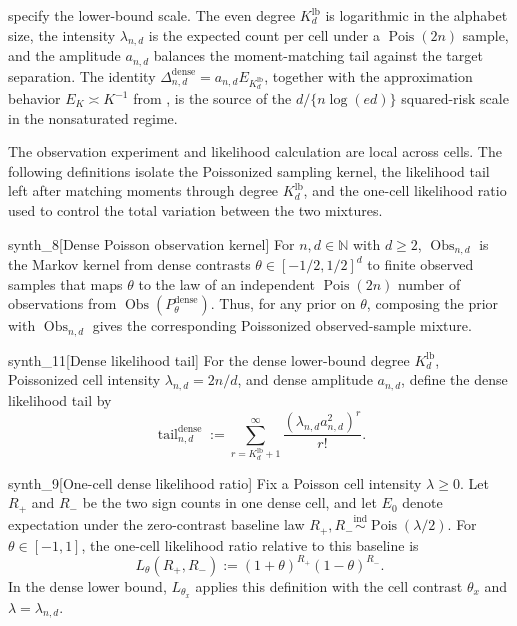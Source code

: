 specify the lower-bound scale. The even degree \(K_d^{\mathrm{lb}}\) is logarithmic in the alphabet size, the intensity \(\lambda_{n,d}\) is the expected count per cell under a \(\operatorname{Pois}(2n)\) sample, and the amplitude \(a_{n,d}\) balances the moment-matching tail against the target separation. The identity \(\Delta_{n,d}^{\mathrm{dense}}=a_{n,d}E_{K_d^{\mathrm{lb}}}\), together with the approximation behavior \(E_K\asymp K^{-1}\) from \citet{CaiLow2011L1}, is the source of the \(d/\{n\log(ed)\}\) squared-risk scale in the nonsaturated regime.

The observation experiment and likelihood calculation are local across cells. The following definitions isolate the Poissonized sampling kernel, the likelihood tail left after matching moments through degree \(K_d^{\mathrm{lb}}\), and the one-cell likelihood ratio used to control the total variation between the two mixtures.

\begin{definitionv}{synth_8}[Dense Poisson observation kernel]
For \(n,d\in\mathbb N\) with \(d\ge2\), \(\operatorname{Obs}_{n,d}\) is the Markov kernel from dense contrasts \(\theta\in[-1/2,1/2]^d\) to finite observed samples that maps \(\theta\) to the law of an independent \(\operatorname{Pois}(2n)\) number of observations from \(\operatorname{Obs}(P_\theta^{\mathrm{dense}})\). Thus, for any prior on \(\theta\), composing the prior with \(\operatorname{Obs}_{n,d}\) gives the corresponding Poissonized observed-sample mixture.
\end{definitionv}

\begin{definitionv}{synth_11}[Dense likelihood tail]
For the dense lower-bound degree \(K_d^{\mathrm{lb}}\), Poissonized cell intensity \(\lambda_{n,d}=2n/d\), and dense amplitude \(a_{n,d}\), define the dense likelihood tail by \[\operatorname{tail}_{n,d}^{\mathrm{dense}}:=\sum_{r=K_d^{\mathrm{lb}}+1}^{\infty}\frac{(\lambda_{n,d}a_{n,d}^2)^r}{r!}.\]
\end{definitionv}

\begin{definitionv}{synth_9}[One-cell dense likelihood ratio]
Fix a Poisson cell intensity \(\lambda\ge0\). Let \(R_+\) and \(R_-\) be the two sign counts in one dense cell, and let \(E_0\) denote expectation under the zero-contrast baseline law \(R_+,R_-\stackrel{\mathrm{ind}}{\sim}\operatorname{Pois}(\lambda/2)\). For \(\theta\in[-1,1]\), the one-cell likelihood ratio relative to this baseline is \[ L_\theta(R_+,R_-):=(1+\theta)^{R_+}(1-\theta)^{R_-}. \] In the dense lower bound, \(L_{\theta_x}\) applies this definition with the cell contrast \(\theta_x\) and \(\lambda=\lambda_{n,d}\).
\end{definitionv}

